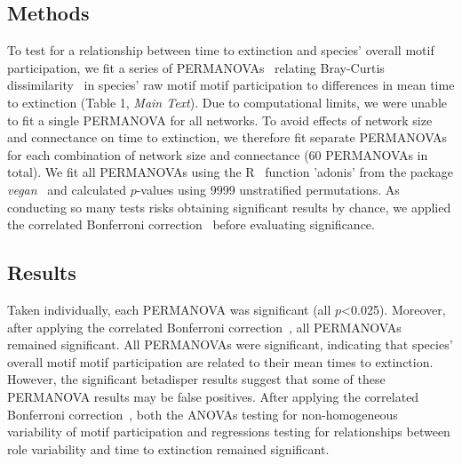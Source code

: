 \documentclass[12pt]{article}
\begin{document}
\begin{spacing}{2.0}
	\subsection*{Methods}


		To test for a relationship between time to extinction and species' overall motif participation, we fit a series of PERMANOVAs~\citep{Anderson2001} relating Bray-Curtis dissimilarity~\citep{Baker2015,Cirtwill2015} in species' raw motif motif participation to differences in mean time to extinction (Table 1, \emph{Main Text}).
		Due to computational limits, we were unable to fit a single PERMANOVA for all networks.
		To avoid effects of network size and connectance on time to extinction, we therefore fit separate PERMANOVAs for each combination of network size and connectance (60 PERMANOVAs in total).
		We fit all PERMANOVAs using the R~\citep{R} function 'adonis' from the package \emph{vegan}~\citep{vegan} and calculated $p$-values using 9999 unstratified permutations.
		As conducting so many tests risks obtaining significant results by chance, we applied the correlated Bonferroni correction~\citep{Drezner2016} before evaluating significance.

	\subsection*{Results}


		Taken individually, each PERMANOVA was significant (all $p$\textless0.025). Moreover, after applying the correlated Bonferroni correction~\citep{Drezner2016}, all PERMANOVAs remained significant.
		All PERMANOVAs were significant, indicating that species' overall motif motif participation are related to their mean times to extinction.
		However, the significant betadisper results suggest that some of these PERMANOVA results may be false positives.
		After applying the correlated Bonferroni correction~\citep{Drezner2016}, both the ANOVAs testing for non-homogeneous variability of motif participation and regressions testing for relationships between role variability and time to extinction remained significant.



\end{spacing}
\end{document}
